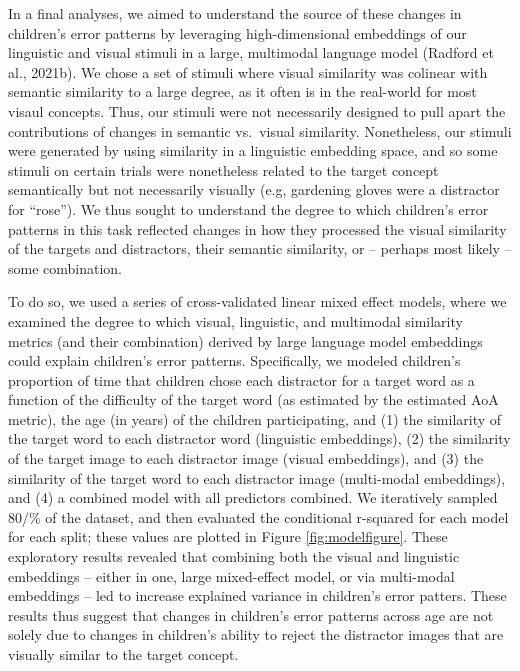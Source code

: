 \documentclass[
  man,mask]{apa6}
\begin{document}
In a final analyses, we aimed to understand the source of these changes in children's error patterns by leveraging high-dimensional embeddings of our linguistic and visual stimuli in a large, multimodal language model (Radford et al., 2021b). We chose a set of stimuli where visual similarity was colinear with semantic similarity to a large degree, as it often is in the real-world for most visaul concepts. Thus, our stimuli were not necessarily designed to pull apart the contributions of changes in semantic vs.~visual similarity. Nonetheless, our stimuli were generated by using similarity in a linguistic embedding space, and so some stimuli on certain trials were nonetheless related to the target concept semantically but not necessarily visually (e.g, gardening gloves were a distractor for ``rose''). We thus sought to understand the degree to which children's error patterns in this task reflected changes in how they processed the visual similarity of the targets and distractors, their semantic similarity, or -- perhaps most likely -- some combination.

To do so, we used a series of cross-validated linear mixed effect models, where we examined the degree to which visual, linguistic, and multimodal similarity metrics (and their combination) derived by large language model embeddings could explain children's error patterns. Specifically, we modeled children's proportion of time that children chose each distractor for a target word as a function of the difficulty of the target word (as estimated by the estimated AoA metric), the age (in years) of the children participating, and (1) the similarity of the target word to each distractor word (linguistic embeddings), (2) the similarity of the target image to each distractor image (visual embeddings), and (3) the similarity of the target word to each distractor image (multi-modal embeddings), and (4) a combined model with all predictors combined. We iteratively sampled 80/\% of the dataset, and then evaluated the conditional r-squared for each model for each split; these values are plotted in Figure \ref{fig:modelfigure}. These exploratory results revealed that combining both the visual and linguistic embeddings -- either in one, large mixed-effect model, or via multi-modal embeddings -- led to increase explained variance in children's error patters. These results thus suggest that changes in children's error patterns across age are not solely due to changes in children's ability to reject the distractor images that are visually similar to the target concept.
\end{document}
